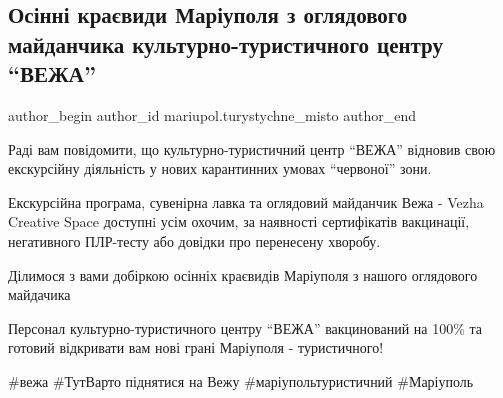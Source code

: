  
 
 
 
 

\subsection{Осінні краєвиди Маріуполя з оглядового майданчика культурно-туристичного центру \enquote{ВЕЖА}}
\label{sec:19_11_2021.fb.mariupol.turystychne_misto.1.osinni_krajevydy_mariupolja_ogljadovyj_majdanchyk_vezha}

\ifcmt
 author_begin
   author_id mariupol.turystychne_misto
 author_end
\fi

Раді вам повідомити, що культурно-туристичний центр \enquote{ВЕЖА} відновив свою
екскурсійну діяльність у нових карантинних умовах \enquote{червоної} зони.

Екскурсійна програма, сувенірна лавка та оглядовий майданчик Вежа - Vezha
Creative Space  доступнi усім охочим, за наявності сертифікатів вакцинації,
негативного ПЛР-тесту або довідки про перенесену хворобу.

Ділимося з вами добіркою осінніх краєвидів Маріуполя з нашого оглядового майдачика 🙂

Персонал культурно-туристичного центру \enquote{ВЕЖА} вакцинований на 100\% та
готовий відкривати вам нові грані Маріуполя - туристичного!

\#вежа \#ТутВарто піднятися на Вежу \#маріупольтуристичний \#Маріуполь
